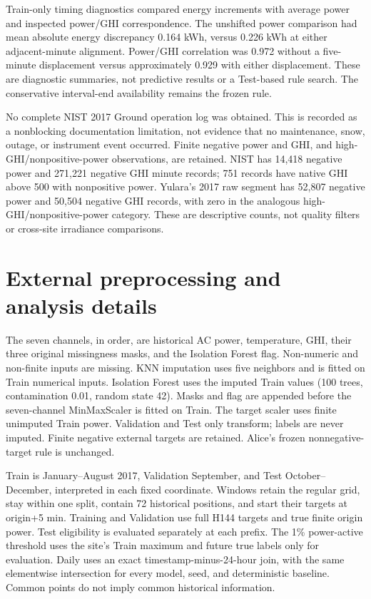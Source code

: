 Train-only timing diagnostics compared energy increments with average power and inspected power/GHI correspondence. The unshifted power comparison had mean absolute energy discrepancy 0.164 kWh, versus 0.226 kWh at either adjacent-minute alignment. Power/GHI correlation was 0.972 without a five-minute displacement versus approximately 0.929 with either displacement. These are diagnostic summaries, not predictive results or a Test-based rule search. The conservative interval-end availability remains the frozen rule.

No complete NIST 2017 Ground operation log was obtained. This is recorded as a nonblocking documentation limitation, not evidence that no maintenance, snow, outage, or instrument event occurred. Finite negative power and GHI, and high-GHI/nonpositive-power observations, are retained. NIST has 14,418 negative power and 271,221 negative GHI minute records; 751 records have native GHI above 500 with nonpositive power. Yulara's 2017 raw segment has 52,807 negative power and 50,504 negative GHI records, with zero in the analogous high-GHI/nonpositive-power category. These are descriptive counts, not quality filters or cross-site irradiance comparisons.



\section{External preprocessing and analysis details}
The seven channels, in order, are historical AC power, temperature, GHI, their three original missingness masks, and the Isolation Forest flag. Non-numeric and non-finite inputs are missing. KNN imputation uses five neighbors and is fitted on Train numerical inputs. Isolation Forest uses the imputed Train values (100 trees, contamination 0.01, random state 42). Masks and flag are appended before the seven-channel MinMaxScaler is fitted on Train. The target scaler uses finite unimputed Train power. Validation and Test only transform; labels are never imputed. Finite negative external targets are retained. Alice's frozen nonnegative-target rule is unchanged.

Train is January--August 2017, Validation September, and Test October--December, interpreted in each fixed coordinate. Windows retain the regular grid, stay within one split, contain 72 historical positions, and start their targets at origin+5 min. Training and Validation use full H144 targets and true finite origin power. Test eligibility is evaluated separately at each prefix. The 1\% power-active threshold uses the site's Train maximum and future true labels only for evaluation. Daily uses an exact timestamp-minus-24-hour join, with the same elementwise intersection for every model, seed, and deterministic baseline. Common points do not imply common historical information.

